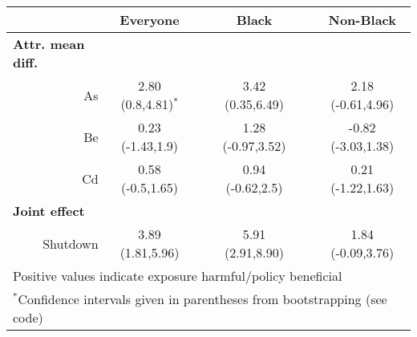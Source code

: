 \begin{tabular}{rccccc}
\hline
      & \textbf{Everyone} &       & \textbf{Black} &       & \textbf{Non-Black} \bigstrut\\
\hline
\multicolumn{1}{l}{\textbf{Attr. mean diff.}} &       &       &       &       &  \bigstrut[t]\\
As & 2.80 (0.8,4.81)$^*$ &       & 3.42 (0.35,6.49) &       & 2.18 (-0.61,4.96) \\
Be & 0.23 (-1.43,1.9) &       & 1.28 (-0.97,3.52) &       & -0.82 (-3.03,1.38) \\
Cd & 0.58 (-0.5,1.65) &       & 0.94 (-0.62,2.5) &       & 0.21 (-1.22,1.63) \\
\multicolumn{1}{l}{\textbf{Joint effect}} &       &       &       &       &  \\
Shutdown & 3.89 (1.81,5.96) &       & 5.91 (2.91,8.90) &       & 1.84 (-0.09,3.76) \bigstrut[b]\\
\hline
\multicolumn{6}{l}{Positive values indicate exposure harmful/policy beneficial}\\
\multicolumn{6}{l}{$^*$Confidence intervals given in parentheses from bootstrapping (see code)}
\end{tabular}%
